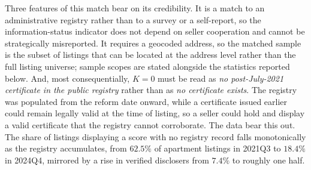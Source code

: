 Three features of this match bear on its credibility. It is a match to an administrative registry
rather than to a survey or a self-report, so the information-status indicator does not depend on
seller cooperation and cannot be strategically misreported. It requires a geocoded address, so the
matched sample is the subset of listings that can be located at the address level rather than the
full listing universe; sample scopes are stated alongside the statistics reported below. And, most
consequentially, $K=0$ must be read as \emph{no post-July-2021 certificate in the public registry}
rather than as \emph{no certificate exists}. The registry was populated from the reform date
onward, while a certificate issued earlier could remain legally valid at the time of listing, so a
seller could hold and display a valid certificate that the registry cannot corroborate. The data
bear this out. The share of listings displaying a score with no registry record falls monotonically
as the registry accumulates, from $62.5\%$ of apartment listings in 2021Q3 to $18.4\%$ in 2024Q4,
mirrored by a rise in verified disclosers from $7.4\%$ to roughly one half.
